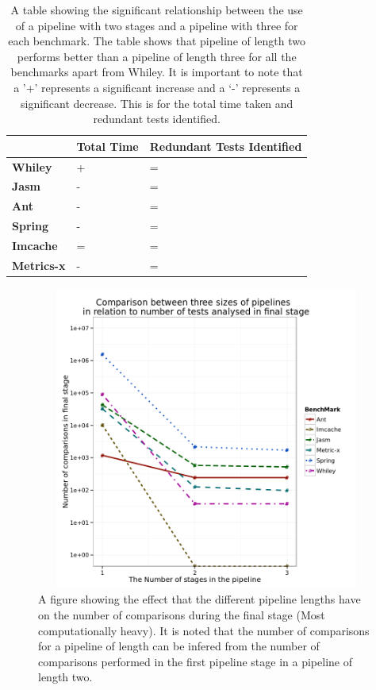 \begin{table}[h]
\centering
\begin{tabular}{|l|l|l|}
\hline
{\bf }          & {\bf Total Time} & {\bf Redundant Tests Identified} \\ \hline
{\bf Whiley}    & +                & =                           \\ \hline
{\bf Jasm}      & -                & =                           \\ \hline
{\bf Ant}       & -                & =                           \\ \hline
{\bf Spring}    & -                & =                           \\ \hline
{\bf Imcache}   & =                & =                           \\ \hline
{\bf Metrics-x} & -                & =                           \\ \hline
\end{tabular}
\caption{A table showing the significant relationship between the use of a pipeline with two stages and a pipeline with three for each benchmark. The table shows that pipeline of length two performs better than a pipeline of length three for all the benchmarks apart from Whiley. It is important to note that a '+' represents a significant increase and a `-' represents a significant decrease. This is for the total time taken and redundant tests identified.}
\label{pipelinesig}
\end{table}

\begin{figure}[h]
\begin{center}
\includegraphics[height=10cm, width = 14.5cm]{Pipeline.png}
\end{center}
\caption{A figure showing the effect that the different pipeline lengths have on the number of comparisons during the final stage (Most computationally heavy). It is noted that the number of comparisons for a pipeline of length can be infered from the number of comparisons performed in the first pipeline stage in a pipeline of length two.}
\label{fig:pipelinegraph}
\end{figure}

